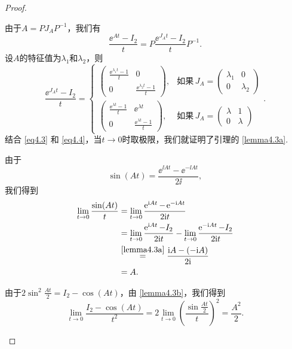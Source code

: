 \begin{proof}
  \begin{inparaenum}[(a)]
    \item 由于$A=PJ_AP^{-1}$，我们有
    \begin{equation}\label{eq4.3}
      \frac{\ee^{At}-I_2}t = P\frac{\ee^{J_At}-I_2}tP^{-1}.
    \end{equation}
    设$A$的特征值为$\lambda_1$和$\lambda_2$，则
    \begin{equation}\label{eq4.4}
      \frac{\ee^{J_At}-I_2}t = \begin{cases}
        \begin{pmatrix}
          \frac{\ee^{\lambda_1t}-1}t & 0 \\
          0 & \frac{\ee^{\lambda_2t}-1}t
        \end{pmatrix}, & \text{如果}\, J_A = \begin{pmatrix}
          \lambda_1 & 0 \\
          0 & \lambda_2
        \end{pmatrix} \\
        \begin{pmatrix}
          \frac{\ee^{\lambda t}-1}t & \ee^{\lambda t}\\
          0 & \frac{\ee^{\lambda t}-1}t
        \end{pmatrix}, & \text{如果}\, J_A = \begin{pmatrix}
          \lambda & 1 \\
          0 & \lambda
        \end{pmatrix}
      \end{cases}.
    \end{equation}
    结合 \eqref{eq4.3} 和 \eqref{eq4.4}，当$t\to0$时取极限，我们就证明了引理的 \ref{lemma4.3a}.

    \item 由于
    \[
      \sin (At) = \frac{\ee^{\ii At} - \ee^{-\ii At}}{2\ii},
    \]
    我们得到
    \begin{align*}
      \lim_{t\to0} \frac{\sin(At)}t & = \lim_{t\to0} \frac{\ee^{\ii At} - \ee^{-\ii At}}{2\ii t} \\
      & = \lim_{t\to0} \frac{\ee^{\ii At} - I_2}{2\ii t} - \lim_{t\to0} \frac{\ee^{-\ii At} - I_2}{2\ii t} \\
      & \overset{\ref{lemma4.3a}}{=} \frac{\ii A-(-\ii A)}{2\ii} \\
      & = A.
    \end{align*}

    \item 由于$2\sin^2\frac{At}2=I_2-\cos(At)$，由 \ref{lemma4.3b}，我们得到
      \[
        \lim_{t\to0} \frac{I_2-\cos(At)}{t^2} = 2\lim_{t\to0} \left( \frac{\sin\frac{At}2}t \right) ^2 = \frac{A^2}2.
      \]


\end{inparaenum}
\end{proof}
